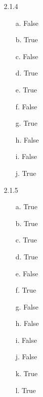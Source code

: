 \documentclass[11pt]{amsart}
\theoremstyle{definition}
\begin{document}
\begin{itemize}
\begin{itemize}
\end{itemize}

\item[2.1.4]
\begin{itemize}
    \item[a.] False

    \item[b.] True 

    \item[c.] False

    \item[d.] True

    \item[e.] True

    \item[f.] False

    \item[g.] True

    \item[h.] False

    \item[i.] False

    \item[j.] True

\end{itemize}

\item[2.1.5]
\begin{itemize}
    \item[a.] True

    \item[b.] True

    \item[c.] True

    \item[d.] True

    \item[e.] False

    \item[f.] True

    \item[g.] False

    \item[h.] False

    \item[i.] False

    \item[j.] False

    \item[k.] True

    \item[l.] True
    

\end{itemize}
\end{itemize}
\end{document}
